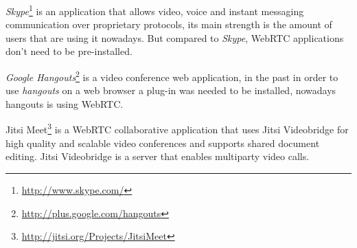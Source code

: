 \textit{Skype}\footnote{\url{http://www.skype.com/}} is an application that allows video, voice and instant messaging communication over proprietary protocols, its main strength is the amount of users that are using it nowadays. But compared to \textit{Skype}, \ac{WebRTC} applications don't need to be pre-installed.

\textit{Google Hangouts}\footnote{\url{http://plus.google.com/hangouts}} is a video conference web application, in the past in order to use \textit{hangouts} on a web browser a plug-in was needed to be installed, nowadays hangouts is using \ac{WebRTC}.

Jitsi Meet\footnote{\url{http://jitsi.org/Projects/JitsiMeet}} is a \ac{WebRTC} collaborative application that uses Jitsi Videobridge for high quality and scalable video conferences and supports shared document editing. Jitsi Videobridge is a server that enables multiparty video calls.




